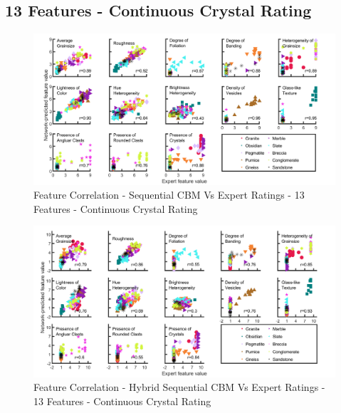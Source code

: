 \subsection{13 Features - Continuous Crystal Rating}

\begin{figure}[H]
  \centering
    \includegraphics[width=\textwidth]{images/MATLAB Correlation - C2_Vs_Expert - 13 Feautres - Continuous.png}
    \caption{Feature Correlation - Sequential CBM Vs Expert Ratings - 13 Features - Continuous Crystal Rating} \label{fig:Feature Correlation - Sequential CBM Vs Expert Ratings - 13 Features - Continuous Crystal Rating}
\end{figure}

\begin{figure}[H]
  \centering
    \includegraphics[width=\textwidth]{images/MATLAB Correlation - Hybrid_Vs_Expert - 13 Feautres - Continuous.png}
    \caption{Feature Correlation - Hybrid Sequential CBM Vs Expert Ratings - 13 Features - Continuous Crystal Rating} \label{fig:Feature Correlation - Hybrid Sequential CBM Vs Expert Ratings - 13 Features - Continuous Crystal Rating}
\end{figure}

